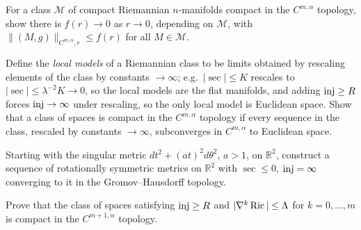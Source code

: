 \begin{remark}
  \label{rem:pet-ch11-exercise-11-6-9}

  For a class $\mathcal{M}$ of compact Riemannian $n$-manifolds compact in
  the $C^{m,\alpha}$ topology, show there is $f(r)\to0$ as $r\to0$, depending
  on $\mathcal{M}$, with $\|(M,g)\|_{C^{m,\alpha},r}\le f(r)$ for all
  $M\in\mathcal{M}$.
\end{remark}

\begin{remark}
  \label{rem:pet-ch11-exercise-11-6-10}

  Define the \emph{local models} of a Riemannian class to be limits
  obtained by rescaling elements of the class by constants $\to\infty$; e.g.\
  $|\sec|\le K$ rescales to $|\sec|\le\lambda^{-2}K\to0$, so the local models
  are the flat manifolds, and adding $\operatorname{inj}\ge R$ forces $\operatorname{inj}\to\infty$ under
  rescaling, so the only local model is Euclidean space. Show that a class of
  spaces is compact in the $C^{m,\alpha}$ topology if every sequence in the
  class, rescaled by constants $\to\infty$, subconverges in $C^{m,\alpha}$ to
  Euclidean space.
\end{remark}

\begin{remark}
  \label{rem:pet-ch11-exercise-11-6-11}

  Starting with the singular metric $dt^2+(at)^2d\theta^2$, $a>1$, on
  $\mathbb{R}^2$, construct a sequence of rotationally symmetric metrics on
  $\mathbb{R}^2$ with
  $\sec\le0$, $\operatorname{inj}=\infty$ converging to it in the Gromov--Hausdorff
  topology.
\end{remark}

\begin{remark}
  \label{rem:pet-ch11-exercise-11-6-12}

  Prove that the class of spaces satisfying $\operatorname{inj}\ge R$ and
  $|\nabla^k\operatorname{Ric}|\le\Lambda$ for $k=0,\dots,m$ is compact in the
  $C^{m+1,\alpha}$ topology.
\end{remark}

